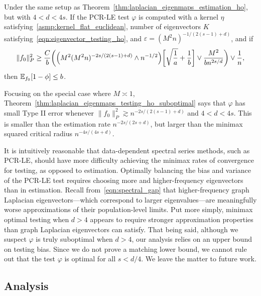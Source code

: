 \begin{theorem}
	\label{thm:laplacian_eigenmaps_testing_ho_suboptimal}
	Under the same setup as Theorem~\ref{thm:laplacian_eigenmaps_estimation_ho}, but with $4 < d < 4s$. If the PCR-LE test $\varphi$ is computed with a kernel $\eta$ satisfying~\ref{asmp:kernel_flat_euclidean}, number of eigenvectors $K$ satisfying~\eqref{eqn:eigenvector_testing_ho}, and $\varepsilon = (M^2n)^{-1/(2(s - 1) + d)}$, and if 
	\begin{equation}
	\label{eqn:laplacian_eigenmaps_testing_criticalradius_ho_suboptimal}
	\|f_0\|_P^2 \geq \frac{C}{b}\biggl(\Bigl(M^2(M^2n)^{-2s/(2(s - 1) + d) } \wedge n^{-1/2}\Bigr)\biggl[\sqrt{\frac{1}{a}} + \frac{1}{b}\biggr] \vee \frac{M^2}{b n^{2s/d}} \biggr) \vee \frac{1}{n},
	\end{equation}
	then $\mathbb{E}_{f_0}[1 - \phi] \leq b$.
\end{theorem}
Focusing on the special case where $M \asymp 1$, Theorem~\ref{thm:laplacian_eigenmaps_testing_ho_suboptimal} says that $\varphi$ has small Type II error whenever $\|f_0\|_P^2 \gtrsim n^{-2s/(2(s - 1) + d)}$ and $4 < d < 4s$. This is smaller than the estimation rate $n^{-2s/(2s + d)}$, but larger than the minimax squared critical radius $n^{-4s/(4s + d)}$. 

It is intuitively reasonable that data-dependent spectral series methods, such as PCR-LE, should have more difficulty achieving the minimax rates of convergence for testing, as opposed to estimation. Optimally balancing the bias and variance of the PCR-LE test requires choosing more and higher-frequency eigenvectors than in estimation. Recall from~\eqref{eqn:spectral_gap} that higher-frequency graph Laplacian eigenvectors---which correspond to larger eigenvalues---are meaningfully worse approximations of their population-level limits. Put more simply, minimax optimal testing when $d > 4$ appears to require stronger approximation properties than graph Laplacian eigenvectors can satisfy.  That being said, although we suspect $\varphi$ is truly suboptimal when $d > 4$, our analysis relies on an upper bound on testing bias. Since we do not prove a matching lower bound, we cannot rule out that the test $\varphi$ is optimal for all $s < d/4$. We leave the matter to future work.

\subsection{Analysis}
\label{subsec:analysis}

